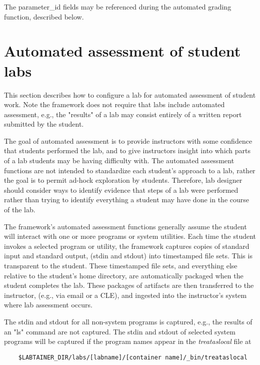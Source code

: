 \documentclass{article}
\begin{document}
The parameter\_id fields may be referenced during the automated grading function, described below. 


\section{Automated assessment of student labs}
This section describes how to configure a lab for automated assessment of student work.
Note the framework does not require that labs include automated assessment, e.g., the
"results" of a lab may consist entirely of a written report submitted by the student.

The goal of automated assessment is to provide instructors with some confidence that 
students performed the lab, and to give instructors insight into which parts
of a lab students may be having difficulty with.  The automated assessment functions are
not intended to standardize each student's approach to a lab, rather the goal is to permit
ad-hock exploration by students.  Therefore, lab designer should consider ways to identify
evidence that steps of a lab were performed rather than trying to identify everything a student
may have done in the course of the lab.

The framework's automated assessment functions generally assume the student will interact with one or
more programs or system utilities.  Each time the student invokes a selected program or utility, the 
framework captures copies of standard input and standard output, (stdin and stdout) into timestamped file sets.
This is transparent to the student.  These timestamped file sets, and everything else relative to
the student's home directory, are automatically packaged when the student completes the lab.
These packages of artifacts are then transferred to the instructor, (e.g., via email or a CLE), and 
ingested into the instructor's system where lab assessment occurs.

The stdin and stdout for all non-system programs is captured, e.g., the results of an "ls" command
are not captured.  The stdin and stdout of selected system programs will be captured if the program
names appear in the \textit{treataslocal} file at
\begin{verbatim}
    $LABTAINER_DIR/labs/[labname]/[container name]/_bin/treataslocal
\end{verbatim}
\end{document}
